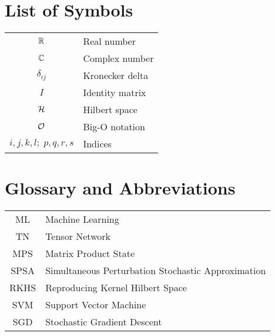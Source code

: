 \chapter*{List of Symbols}
\begin{tabular}{c p{}}
    $\mathbb{R}$ & Real number \\
    $\mathbb{C}$ & Complex number \\
    $\delta_{ij}$ & Kronecker delta \\
    $I$ & Identity matrix \\
    $\mathcal{H}$ & Hilbert space \\
    $\mathcal{O}$ & Big-O notation \\
    $i,j,k,l;\; p,q,r,s$ & Indices \\
\end{tabular}



\chapter*{Glossary and Abbreviations}
\begin{tabular}{c p{}}
    ML & Machine Learning \\
    TN & Tensor Network \\
    MPS & Matrix Product State \\
    SPSA & Simultaneous Perturbation Stochastic Approximation \\
    RKHS & Reproducing Kernel Hilbert Space \\
    SVM & Support Vector Machine \\
    SGD & Stochastic Gradient Descent \\
\end{tabular}


